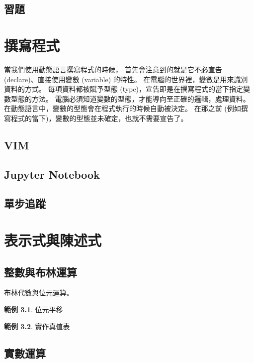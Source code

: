\documentclass[a4paper,12pt]{book}
\theoremstyle{definition}
\newtheorem{example}{範例}[chapter]
\begin{document}
\section{習題}

\chapter{撰寫程式}
%
\label{c:write}

當我們使用動態語言撰寫程式的時候，
首先會注意到的就是它不必宣告 (declare)、直接使用變數 (variable) 的特性。
在電腦的世界裡，變數是用來識別資料的方式。
每項資料都被賦予型態 (type)，宣告即是在撰寫程式的當下指定變數型態的方法。
電腦必須知道變數的型態，才能導向至正確的邏輯，處理資料。
在動態語言中，變數的型態會在程式執行的時候自動被決定。
在那之前 (例如撰寫程式的當下)，變數的型態並未確定，也就不需要宣告了。

\section{VIM}

\section{Jupyter Notebook}

\section{單步追蹤}

\chapter{表示式與陳述式}
%
\label{c:arithmic}

\section{整數與布林運算}

布林代數與位元運算。

\begin{example}
位元平移
\end{example}

\begin{example}
實作真值表
\end{example}

\section{實數運算}
\end{document}
